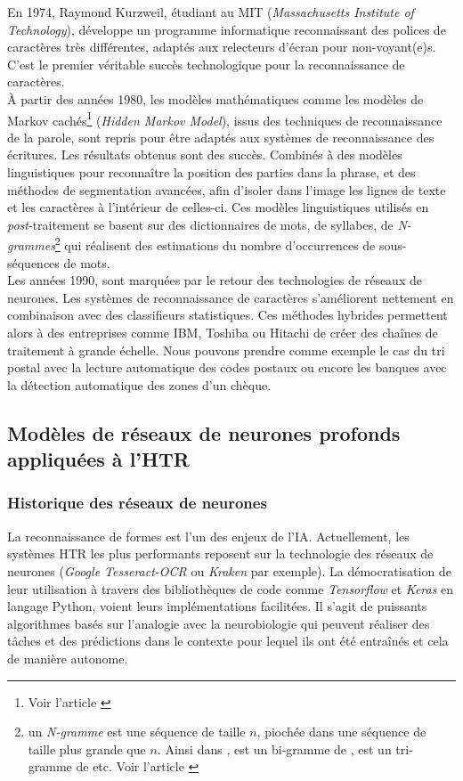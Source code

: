 En 1974, Raymond Kurzweil, étudiant au MIT (\textit{Massachusetts Institute of Technology}), développe un programme informatique reconnaissant des polices de caractères très différentes, adaptés aux relecteurs d'écran pour non-voyant(e)s. C'est le premier véritable succès technologique pour la reconnaissance de caractères.\\ 

À partir des années 1980, les modèles mathématiques comme les modèles de Markov cachés\footnote{Voir l'article \cite{wikipedia_modemarkov_nodate}} (\textit{Hidden Markov Model}), issus des techniques de reconnaissance de la parole, sont repris pour être adaptés aux systèmes de reconnaissance des écritures. Les résultats obtenus sont des succès. Combinés à des modèles linguistiques pour reconnaître la position des parties dans la phrase, et des méthodes de segmentation avancées, afin d'isoler dans l'image les lignes de texte et les caractères à l'intérieur de celles-ci. Ces modèles linguistiques utilisés en \textit{post}-traitement se basent sur des dictionnaires de mots, de syllabes, de \textit{N-grammes}\footnote{un \textit{N-gramme} est une séquence de taille $n$, piochée dans une séquence de taille plus grande que $n$. Ainsi dans ,  est un bi-gramme de ,  est un tri-gramme de  etc. Voir l'article \cite{wikipedia_n-gramme_nodate}} qui réalisent des estimations du nombre d'occurrences de sous-séquences de mots.\\ 

Les années 1990, sont marquées par le retour des technologies de réseaux de neurones. Les systèmes de reconnaissance de caractères s'améliorent nettement en combinaison avec des classifieurs statistiques. Ces méthodes hybrides permettent alors à des entreprises comme IBM, Toshiba ou Hitachi de créer des chaînes de traitement à grande échelle. Nous pouvons prendre comme exemple le cas du tri postal avec la lecture automatique des codes postaux ou encore les banques avec la détection automatique des zones d'un chèque.
\newpage
\subsection{Modèles de réseaux de neurones profonds appliquées à l'HTR}

\subsubsection{Historique des réseaux de neurones}
La reconnaissance de formes est l'un des enjeux de l'IA. Actuellement, les systèmes HTR les plus performants reposent sur la technologie des réseaux de neurones (\textit{Google Tesseract-OCR} ou \textit{Kraken} par exemple). La démocratisation de leur utilisation à travers des bibliothèques de code comme \textit{Tensorflow} et \textit{Keras} en langage Python, voient leurs implémentations facilitées. Il s'agit de puissants algorithmes basés sur l'analogie avec la neurobiologie qui peuvent réaliser des tâches et des prédictions dans le contexte pour lequel ils ont été entraînés et cela de manière autonome.\\      


